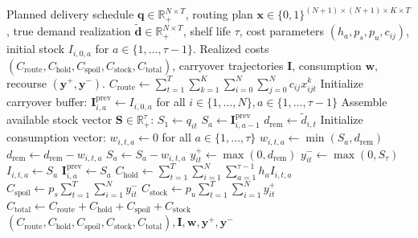 \documentclass[11pt,a4paper]{article}
\theoremstyle{definition}
\theoremstyle{remark}
\begin{document}
\begin{algorithm}[H]
\caption{Post-Decision FIFO Perishable Inventory Evaluation Simulator}
\label{alg:fifo_simulator}
\begin{algorithmic}[1]
\Require Planned delivery schedule $\mathbf{q} \in \mathbb{R}_+^{N \times T}$, routing plan $\mathbf{x} \in \{0, 1\}^{(N+1) \times (N+1) \times K \times T}$, true demand realization $\tilde{\mathbf{d}} \in \mathbb{R}_+^{N \times T}$, shelf life $\tau$, cost parameters $(h_a, p_s, p_u, c_{ij})$, initial stock $I_{i,0,a}$ for $a \in \{1, \dots, \tau-1\}$.
\Ensure Realized costs $(C_{\text{route}}, C_{\text{hold}}, C_{\text{spoil}}, C_{\text{stock}}, C_{\text{total}})$, carryover trajectories $\mathbf{I}$, consumption $\mathbf{w}$, recourse $(\mathbf{y}^+, \mathbf{y}^-)$.
\State $C_{\text{route}} \gets \sum_{t=1}^T \sum_{k=1}^K \sum_{i=0}^N \sum_{j=0}^N c_{ij} x_{ijt}^k$
\State Initialize carryover buffer: $\mathbf{I}^{\text{prev}}_{i, a} \gets I_{i,0,a}$ for all $i \in \{1, \dots, N\}, a \in \{1, \dots, \tau-1\}$
        \State Assemble available stock vector $\mathbf{S} \in \mathbb{R}_+^\tau$:
        \State $S_1 \gets q_{it}$ 
            \State $S_a \gets \mathbf{I}^{\text{prev}}_{i, a-1}$ 
        \EndFor
        \State $d_{\text{rem}} \gets \tilde{d}_{i,t}$
        \State Initialize consumption vector: $w_{i,t,a} \gets 0$ for all $a \in \{1, \dots, \tau\}$
                \State $w_{i,t,a} \gets \min(S_a, d_{\text{rem}})$
                \State $d_{\text{rem}} \gets d_{\text{rem}} - w_{i,t,a}$
                \State $S_a \gets S_a - w_{i,t,a}$
            \EndIf
        \EndFor
        \State {}
        \State $y_{it}^+ \gets \max(0, d_{\text{rem}})$ 
        \State $y_{it}^- \gets \max(0, S_\tau)$ 
            \State $I_{i,t,a} \gets S_a$ 
            \State $\mathbf{I}^{\text{prev}}_{i, a} \gets S_a$
        \EndFor
    \EndFor
\EndFor
\State $C_{\text{hold}} \gets \sum_{t=1}^T \sum_{i=1}^N \sum_{a=1}^{\tau-1} h_a I_{i,t,a}$
\State $C_{\text{spoil}} \gets p_s \sum_{t=1}^T \sum_{i=1}^N y_{it}^-$
\State $C_{\text{stock}} \gets p_u \sum_{t=1}^T \sum_{i=1}^N y_{it}^+$
\State $C_{\text{total}} \gets C_{\text{route}} + C_{\text{hold}} + C_{\text{spoil}} + C_{\text{stock}}$
\State \Return $(C_{\text{route}}, C_{\text{hold}}, C_{\text{spoil}}, C_{\text{stock}}, C_{\text{total}}), \mathbf{I}, \mathbf{w}, \mathbf{y}^+, \mathbf{y}^-$
\end{algorithmic}
\end{algorithm}
\end{document}
